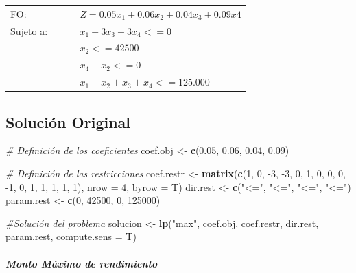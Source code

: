 \documentclass[
]{article}
\newenvironment{Shaded}{\begin{snugshade}}{\end{snugshade}}
\newcommand{\CommentTok}[1]{\textcolor[rgb]{0.56,0.35,0.01}{\textit{#1}}}
\newcommand{\DataTypeTok}[1]{\textcolor[rgb]{0.13,0.29,0.53}{#1}}
\newcommand{\DecValTok}[1]{\textcolor[rgb]{0.00,0.00,0.81}{#1}}
\newcommand{\FloatTok}[1]{\textcolor[rgb]{0.00,0.00,0.81}{#1}}
\newcommand{\KeywordTok}[1]{\textcolor[rgb]{0.13,0.29,0.53}{\textbf{#1}}}
\newcommand{\NormalTok}[1]{#1}
\newcommand{\StringTok}[1]{\textcolor[rgb]{0.31,0.60,0.02}{#1}}
\begin{document}
\begin{longtable}[]{@{}ll@{}}
\toprule
\endhead
FO: & \(Z=0.05x_1+0.06x_2+0.04x_3+0.09x4\)\tabularnewline
Sujeto a:\(\hspace{1cm}\) & \(x_1-3x_3-3x_4<= 0\)\tabularnewline
& \(x_2<= 42500\)\tabularnewline
& \(x_4-x_2<=0\)\tabularnewline
& \(x_1+x_2+x_3+x_4<= 125.000\)\tabularnewline
\bottomrule
\end{longtable}

\hypertarget{soluciuxf3n-original}{%
\subsection{Solución Original}\label{soluciuxf3n-original}}

\begin{Shaded}
\begin{Highlighting}[]
\CommentTok{# Definición de los coeficientes}
\NormalTok{coef.obj <-}\StringTok{ }\KeywordTok{c}\NormalTok{(}\FloatTok{0.05}\NormalTok{, }\FloatTok{0.06}\NormalTok{, }\FloatTok{0.04}\NormalTok{, }\FloatTok{0.09}\NormalTok{)}

\CommentTok{# Definición de las restricciones}
\NormalTok{coef.restr <-}\StringTok{ }\KeywordTok{matrix}\NormalTok{(}\KeywordTok{c}\NormalTok{(}\DecValTok{1}\NormalTok{, }\DecValTok{0}\NormalTok{, }\DecValTok{-3}\NormalTok{, }\DecValTok{-3}\NormalTok{, }\DecValTok{0}\NormalTok{, }\DecValTok{1}\NormalTok{, }\DecValTok{0}\NormalTok{, }\DecValTok{0}\NormalTok{, }\DecValTok{0}\NormalTok{, }\DecValTok{-1}\NormalTok{, }\DecValTok{0}\NormalTok{, }\DecValTok{1}\NormalTok{, }\DecValTok{1}\NormalTok{, }\DecValTok{1}\NormalTok{, }\DecValTok{1}\NormalTok{, }\DecValTok{1}\NormalTok{), }\DataTypeTok{nrow =} \DecValTok{4}\NormalTok{, }\DataTypeTok{byrow =}\NormalTok{ T)}
\NormalTok{dir.rest <-}\StringTok{ }\KeywordTok{c}\NormalTok{(}\StringTok{"<="}\NormalTok{, }\StringTok{"<="}\NormalTok{, }\StringTok{"<="}\NormalTok{, }\StringTok{"<="}\NormalTok{)}
\NormalTok{param.rest <-}\StringTok{ }\KeywordTok{c}\NormalTok{(}\DecValTok{0}\NormalTok{, }\DecValTok{42500}\NormalTok{, }\DecValTok{0}\NormalTok{, }\DecValTok{125000}\NormalTok{)}

\CommentTok{#Solución del problema}
\NormalTok{solucion <-}\StringTok{ }\KeywordTok{lp}\NormalTok{(}\StringTok{"max"}\NormalTok{, coef.obj, coef.restr, dir.rest, param.rest, }\DataTypeTok{compute.sens =}\NormalTok{ T)}
\end{Highlighting}
\end{Shaded}

\hypertarget{monto-muxe1ximo-de-rendimiento}{%
\subparagraph{Monto Máximo de
rendimiento}\label{monto-muxe1ximo-de-rendimiento}}
\end{document}
